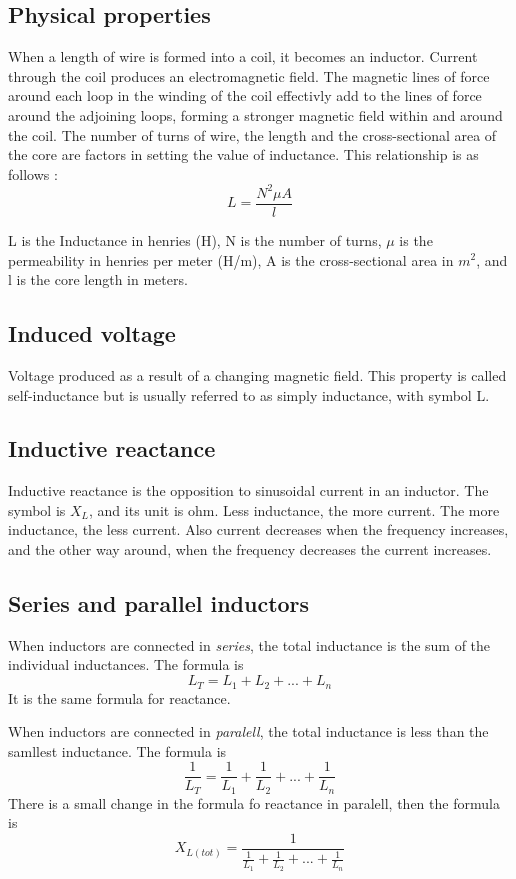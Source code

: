 \subsection{Physical properties}
When a length of wire is formed into a coil, it becomes an inductor. Current through the coil produces an electromagnetic field. The magnetic lines of force around each loop in the winding of the coil effectivly add to the lines of force around the adjoining loops, forming a stronger magnetic field within and around the coil. The number of turns of wire, the length and the cross-sectional area of the core are factors in setting the value of inductance. This relationship is as follows : 
\[L = \frac{N^2 \mu A}{l}\]

L is the Inductance in henries (H), N is the number of turns, $\mu$ is the permeability in henries per meter (H/m), A is the cross-sectional area in $m^2$, and l is the core length in meters.

\subsection{Induced voltage}
Voltage produced as a result of a changing magnetic field. This property is called self-inductance but is usually referred to as simply inductance, with symbol L.

\subsection{Inductive reactance}
Inductive reactance is the opposition to sinusoidal current in an inductor. The symbol is $X_L$, and its unit is ohm. Less inductance, the more current. The more inductance, the less current. Also current decreases when the frequency increases, and the other way around, when the frequency decreases the current increases.

\subsection{Series and parallel inductors}
When inductors are connected in \emph{series}, the total inductance is the sum of the individual inductances. The formula is
\[L_T = L_1 + L_2 + ... + L_n\]
It is the same formula for reactance.

\noindent When inductors are connected in \emph{paralell}, the total inductance is less than the samllest inductance. The formula is 
\[\frac{1}{L_T} = \frac{1}{L_1} +\frac{1}{L_2} + ... + \frac{1}{L_n}\]
There is a small change in the formula fo reactance in paralell, then the formula is 
\[X_{L(tot)} = \frac{1}{\frac{1}{L_1} +\frac{1}{L_2} + ... + \frac{1}{L_n}}\]

